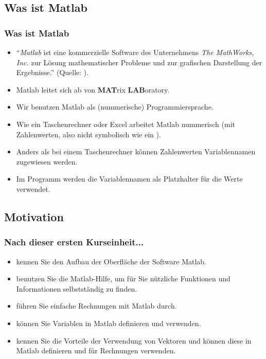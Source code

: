     \subsection{Was ist Matlab}
    \begin{frame}
        \frametitle{Was ist Matlab}
        \begin{itemize}
          \item ``\emph{Matlab} ist eine kommerzielle Software des Unternehmens \emph{The MathWorks, Inc.} zur Lösung mathematischer Probleme
          und zur grafischen Darstellung der Ergebnisse.'' (Quelle: ).
          \item Matlab leitet sich ab von \textbf{MAT}rix \textbf{LAB}oratory.
          \item Wir benutzen Matlab als (nummerische) Programmiersprache.
          \item Wie ein Taschenrechner oder Excel arbeitet Matlab nummerisch (mit Zahlenwerten, also nicht symbolisch wie
          ein ).
          \item Anders als bei einem Taschenrechner können Zahlenwerten Variablennamen zugewiesen werden.
          \item Im Programm werden die Variablennamen als Platzhalter für die Werte verwendet.
        \end{itemize}
    \end{frame}

    \subsection{Motivation}
    \begin{frame}
        \frametitle{Nach dieser ersten Kurseinheit...}
        \begin{itemize}
          \itemsep0.3cm
          \item kennen Sie den Aufbau der Oberfläche der Software Matlab.
          \item benutzen Sie die Matlab-Hilfe, um für Sie nützliche Funktionen und Informationen selbstständig zu finden.
          \item führen Sie einfache Rechnungen mit Matlab durch.
          \item können Sie Variablen in Matlab definieren und verwenden.
          \item kennen Sie die Vorteile der Verwendung von Vektoren und können diese in Matlab definieren und für Rechnungen verwenden.
        \end{itemize}
    \end{frame}


